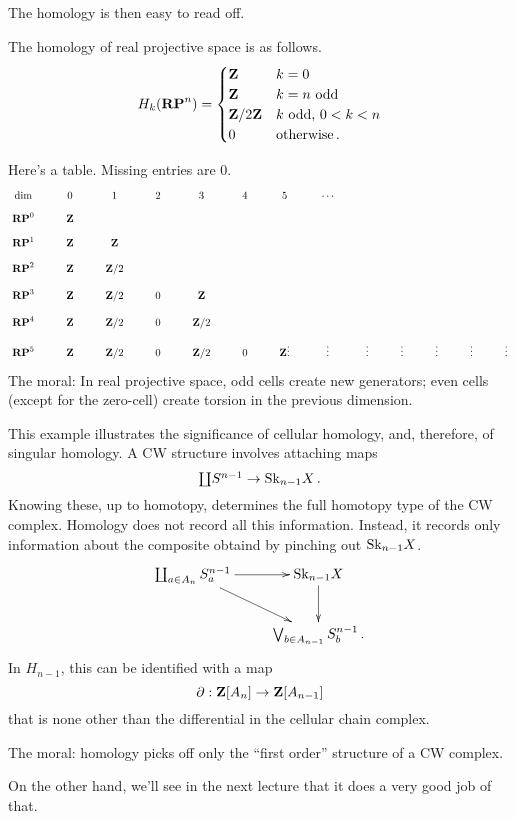The homology is then easy to read off.
\begin{prop}
The homology of real projective space is as follows.
\begin{equation*}
 H_k(\mathbf{RP}^n)=\begin{cases}
\mathbf Z & k=0\\
\mathbf Z & k=n\text{ odd}\\
\mathbf Z/2\mathbf Z & k\text{ odd, }0<k<n\\
0 & \text{otherwise}\,.
\end{cases}
\end{equation*}
\end{prop}
Here's a table. Missing entries are $0$.
\[
\xymatrix@R=8pt{
\text{dim} & 0 & 1 & 2 & 3 & 4 & 5 & \cdots \\
\RP^0 & \ZZ \\
\RP^1 & \ZZ & \ZZ \\
\RP^2 & \ZZ & \ZZ/2 \\
\RP^3 & \ZZ & \ZZ/2 & 0 & \ZZ \\
\RP^4 & \ZZ & \ZZ/2 & 0 & \ZZ/2 \\
\RP^5 & \ZZ & \ZZ/2 & 0 & \ZZ/2 & 0 & \ZZ 
\vdots & \vdots & \vdots & \vdots & \vdots & \vdots & \vdots
}\]
The moral: In real projective space, 
odd cells create new generators; even cells (except for the zero-cell) create
torsion in the previous dimension. 

This example illustrates the significance of cellular homology, and, therefore,
of singular homology. A CW structure involves attaching maps 
\[
\textstyle{\coprod}S^{n-1}\to\mathrm{Sk}_{n-1} X\,.
\]
Knowing these, up to homotopy, determines the full homotopy type of the CW 
complex. Homology does not record all this information. Instead, it records 
only information about the composite obtaind by pinching out $\mathrm{Sk}_{n-1}X$.
\[
\xymatrix{ 
\coprod_{a\in A_n} S^{n-1}_a \ar[r] \ar[dr] & \Sk_{n-1} X \ar[d] \\
& \bigvee_{b\in A_{n-1}} S^{n-1}_b\,.
}\]
In $H_{n-1}$, this can be identified with a map
\[
\partial:\mathbf Z[A_n]\to\mathbf Z[A_{n-1}]
\]
that is none other than the differential in the cellular chain complex.

The moral: homology picks off only the ``first order'' structure of a CW 
complex. 

On the other hand, we'll see in the next lecture that it does a very good job
of that. 



